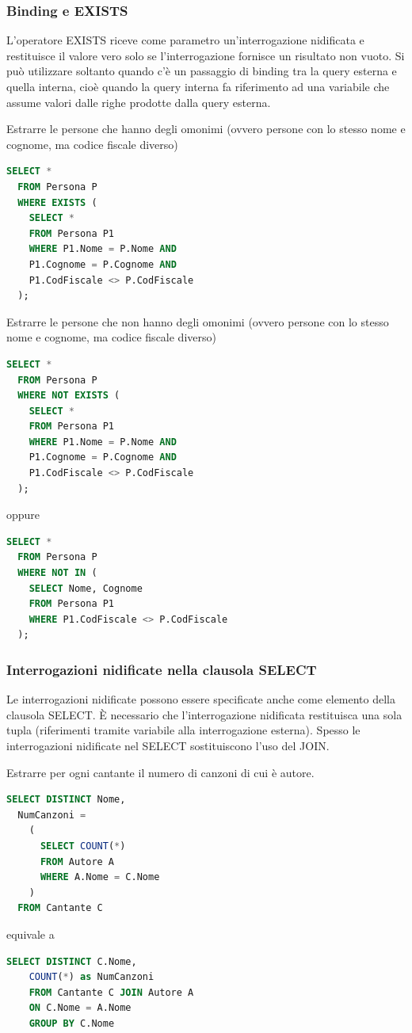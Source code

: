 \documentclass[a4paper]{article}
\begin{document}
\subsubsection{Binding e EXISTS}
L'operatore EXISTS riceve come parametro un'interrogazione nidificata e restituisce il
valore vero solo se l'interrogazione fornisce un risultato non vuoto. Si può utilizzare
soltanto quando c'è un passaggio di binding tra la query esterna e quella interna,
cioè quando la query interna fa riferimento ad una variabile che assume valori dalle
righe prodotte dalla query esterna.
\begin{example}
  Estrarre le persone che hanno degli omonimi (ovvero
  persone con lo stesso nome e cognome, ma codice fiscale
  diverso)
\begin{lstlisting}[language=SQL]
SELECT *
  FROM Persona P
  WHERE EXISTS (
    SELECT *
    FROM Persona P1
    WHERE P1.Nome = P.Nome AND
    P1.Cognome = P.Cognome AND
    P1.CodFiscale <> P.CodFiscale
  );
\end{lstlisting}
\end{example}
\begin{example}
  Estrarre le persone che non hanno degli omonimi (ovvero
  persone con lo stesso nome e cognome, ma codice fiscale
  diverso)
\begin{lstlisting}[language=SQL]
SELECT *
  FROM Persona P
  WHERE NOT EXISTS (
    SELECT *
    FROM Persona P1
    WHERE P1.Nome = P.Nome AND
    P1.Cognome = P.Cognome AND
    P1.CodFiscale <> P.CodFiscale
  );
\end{lstlisting}
  oppure
\begin{lstlisting}[language=SQL]
SELECT *
  FROM Persona P
  WHERE NOT IN (
    SELECT Nome, Cognome
    FROM Persona P1
    WHERE P1.CodFiscale <> P.CodFiscale
  );
\end{lstlisting}
\end{example}

\subsubsection{Interrogazioni nidificate nella clausola SELECT}
Le interrogazioni nidificate possono essere specificate anche come
elemento della clausola SELECT.
È necessario che l’interrogazione nidificata restituisca una
sola tupla (riferimenti tramite variabile alla interrogazione esterna).
Spesso le interrogazioni nidificate nel SELECT
sostituiscono l'uso del JOIN.
\begin{example}
  Estrarre per ogni cantante il numero di canzoni di cui è autore.
\begin{lstlisting}[language=SQL]
SELECT DISTINCT Nome,
  NumCanzoni =
    (
      SELECT COUNT(*)
      FROM Autore A
      WHERE A.Nome = C.Nome
    )
  FROM Cantante C
\end{lstlisting}
  equivale a 
\begin{lstlisting}[language=SQL]
  SELECT DISTINCT C.Nome,
    COUNT(*) as NumCanzoni
    FROM Cantante C JOIN Autore A
    ON C.Nome = A.Nome
    GROUP BY C.Nome
\end{lstlisting}
\end{example}
\end{document}
